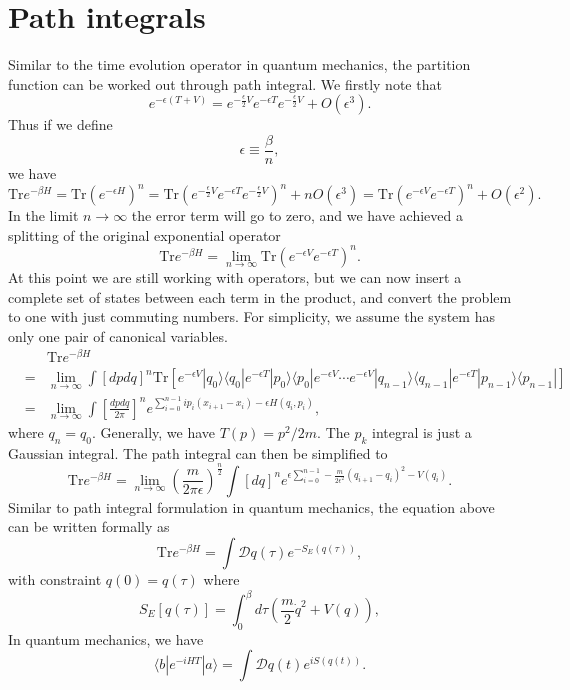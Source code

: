 \section{Path integrals}
Similar to the time evolution operator in quantum mechanics, the partition function can be worked out through path integral. We firstly note that
\[e^{-\epsilon(T+V)} = e^{-\frac{\epsilon}{2} V}e^{-\epsilon T} e^{-\frac{\epsilon}{2} V} + O(\epsilon^3).\]
Thus if we define
\[\epsilon \equiv \frac{\beta}{n},\]
we have
\[\mathrm{Tr}e^{-\beta H} = \mathrm{Tr} \left( e^{-\epsilon H} \right)^n = \mathrm{Tr} \left(e^{-\frac{\epsilon}{2} V}e^{-\epsilon T} e^{-\frac{\epsilon}{2} V}\right)^n + nO(\epsilon^3) = \mathrm{Tr} \left(e^{-\epsilon V}e^{-\epsilon T} \right)^n + O(\epsilon^2).\]
In the limit $n \to \infty$ the error term will go to zero, and we have achieved a splitting of the original exponential operator
\[\mathrm{Tr}e^{-\beta H} = \lim_{n \to \infty} \mathrm{Tr} \left(e^{-\epsilon V}e^{-\epsilon T} \right)^n.\]
At this point we are still working with operators, but we can now insert a complete set of states between each term in the product, and convert the problem to one with just commuting numbers. For simplicity, we assume the system has only one pair of canonical variables.
\begin{eqnarray}
&\phantom{=}& \mathrm{Tr}e^{-\beta H} \nonumber \\
&=& \lim_{n \to \infty} \int [dpdq]^n  \mathrm{Tr} [ e^{-\epsilon V}|q_0\rangle \langle q_0 | e^{-\epsilon T} |p_0 \rangle\langle p_0| e^{-\epsilon V} \cdots e^{-\epsilon V} |q_{n-1}\rangle\langle q_{n-1}| e^{-\epsilon T} |p_{n-1}\rangle\langle p_{n-1} | ] \nonumber \\
&=& \lim_{n \to \infty} \int [\frac{dpdq}{2\pi}]^n e^{\sum_{i=0}^{n-1}ip_i(x_{i+1}-x_i) - \epsilon H(q_i,p_i)} ,\nonumber
\end{eqnarray}
where $q_{n} = q_0$. 
Generally, we have $T(p) = p^2/2m$. The $p_k$ integral is just a Gaussian integral. The path integral can then be simplified to
\[\mathrm{Tr}e^{-\beta H} = \lim_{n \to \infty} \left( \frac{m}{2\pi \epsilon} \right)^{\frac{n}{2}} \int [dq]^n e^{\epsilon \sum_{i=0}^{n-1}  -\frac{m}{2\epsilon^2}(q_{i+1}-q_i)^2 -  V(q_i)} .\]
Similar to path integral formulation in quantum mechanics, the equation above can be written formally as
\[\mathrm{Tr}e^{-\beta H} = \int \mathcal{D}q(\tau) e^{-S_E(q(\tau))},\]
with constraint $q(0) = q(\tau)$
where
\[S_E[q(\tau)] = \int_0^{\beta} d\tau \left(\frac{m}{2}\dot{q}^2 + V(q) \right),\]
In quantum mechanics, we have
\[\langle b | e^{-iHT} | a \rangle = \int \mathcal{D}q(t) e^{iS(q(t))}.\]
